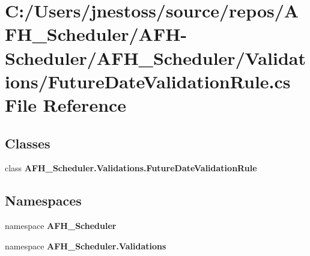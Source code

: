 \section{C\+:/\+Users/jnestoss/source/repos/\+A\+F\+H\+\_\+\+Scheduler/\+A\+F\+H-\/\+Scheduler/\+A\+F\+H\+\_\+\+Scheduler/\+Validations/\+Future\+Date\+Validation\+Rule.cs File Reference}
\label{_future_date_validation_rule_8cs}
\subsection*{Classes}
\begin{DoxyCompactItemize}
\item 
class \textbf{ A\+F\+H\+\_\+\+Scheduler.\+Validations.\+Future\+Date\+Validation\+Rule}
\end{DoxyCompactItemize}
\subsection*{Namespaces}
\begin{DoxyCompactItemize}
\item 
namespace \textbf{ A\+F\+H\+\_\+\+Scheduler}
\item 
namespace \textbf{ A\+F\+H\+\_\+\+Scheduler.\+Validations}
\end{DoxyCompactItemize}
